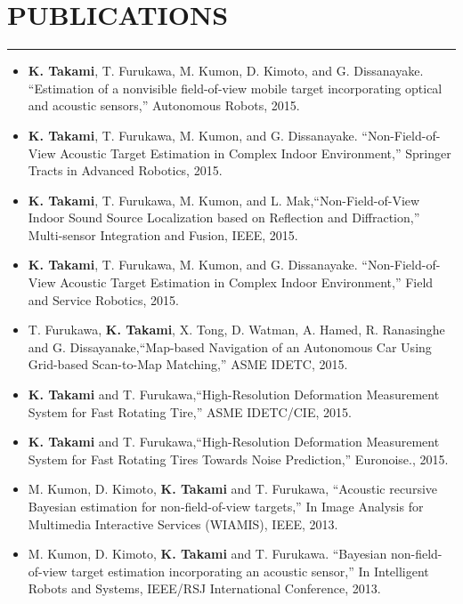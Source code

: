 \documentclass[12pt,letterpaper]{article}
\begin{document}
\section*{PUBLICATIONS}
\vspace{-2mm}
\hrule
\begin{itemize}[label={}]
\item {\bf K. Takami}, T. Furukawa, M. Kumon, D. Kimoto, and G. Dissanayake. ``Estimation of a nonvisible field-of-view mobile target incorporating optical and acoustic sensors,'' Autonomous Robots, 2015.

\item {\bf K. Takami}, T. Furukawa, M. Kumon, and G. Dissanayake. ``Non-Field-of-View Acoustic Target Estimation in Complex Indoor Environment,'' Springer Tracts in Advanced Robotics, 2015.

\item  {\bf K. Takami}, T. Furukawa, M. Kumon, and L. Mak,``Non-Field-of-View Indoor Sound Source Localization based on Reflection and Diffraction,'' Multi-sensor Integration and Fusion, IEEE, 2015.

\item {\bf K. Takami}, T. Furukawa, M. Kumon, and G. Dissanayake. ``Non-Field-of-View Acoustic Target Estimation in Complex Indoor Environment,'' Field and Service Robotics, 2015.

\item  T. Furukawa, {\bf K. Takami}, X. Tong, D. Watman, A. Hamed, R. Ranasinghe and G. Dissayanake,``Map-based Navigation of an Autonomous Car Using Grid-based Scan-to-Map Matching,'' ASME IDETC, 2015.

\item  {\bf K. Takami} and T. Furukawa,``High-Resolution Deformation Measurement System for Fast Rotating Tire,'' ASME IDETC/CIE, 2015.



\item  {\bf K. Takami} and T. Furukawa,``High-Resolution Deformation Measurement System for Fast Rotating Tires Towards Noise Prediction,'' Euronoise., 2015.

\item M. Kumon, D. Kimoto, {\bf K. Takami} and T. Furukawa, ``Acoustic recursive Bayesian estimation for non-field-of-view targets,'' In Image Analysis for Multimedia Interactive Services (WIAMIS), IEEE, 2013.

\item M. Kumon, D. Kimoto, {\bf K. Takami} and T. Furukawa. ``Bayesian non-field-of-view target estimation incorporating an acoustic sensor,'' In Intelligent Robots and Systems, IEEE/RSJ International Conference, 2013.


\end{itemize}
\end{document}

